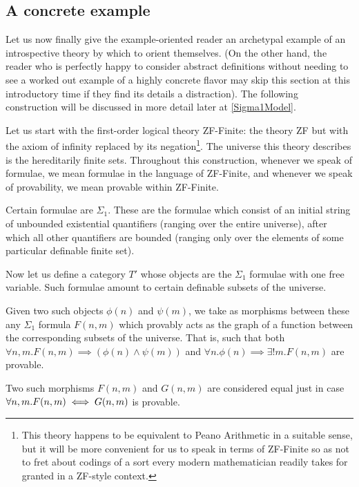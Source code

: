 \documentclass[./main.tex]{subfiles}
\begin{document}
\subsection{A concrete example}

\begin{construction}\label{SigmaModelSimple}
Let us now finally give the example-oriented reader an archetypal example of an introspective theory by which to orient themselves. (On the other hand, the reader who is perfectly happy to consider abstract definitions without needing to see a worked out example of a highly concrete flavor may skip this section at this introductory time if they find its details a distraction). The following construction will be discussed in more detail later at \cref{Sigma1Model}.
\end{construction}

Let us start with the first-order logical theory ZF-Finite: the theory ZF but with the axiom of infinity replaced by its negation\footnote{This theory happens to be equivalent to Peano Arithmetic in a suitable sense, but it will be more convenient for us to speak in terms of ZF-Finite so as not to fret about codings of a sort every modern mathematician readily takes for granted in a ZF-style context.}. The universe this theory describes is the hereditarily finite sets. Throughout this construction, whenever we speak of formulae, we mean formulae in the language of ZF-Finite, and whenever we speak of provability, we mean provable within ZF-Finite.

Certain formulae are $\Sigma_1$. These are the formulae which consist of an initial string of unbounded existential quantifiers (ranging over the entire universe), after which all other quantifiers are bounded (ranging only over the elements of some particular definable finite set).

Now let us define a category $T'$ whose objects are the $\Sigma_1$ formulae with one free variable. Such formulae amount to certain definable subsets of the universe.

Given two such objects $\phi(n)$ and $\psi(m)$, we take as morphisms between these any $\Sigma_1$ formula $F(n, m)$ which provably acts as the graph of a function between the corresponding subsets of the universe. That is, such that both $\forall n, m . F(n, m) \implies (\phi(n) \wedge \psi(m))$ and $\forall n . \phi(n) \implies \exists! m . F(n, m)$ are provable.

Two such morphisms $F(n, m)$ and $G(n, m)$ are considered equal just in case $\forall n, m . F(n, m) \iff G(n, m)$ is provable. 
\end{document}

